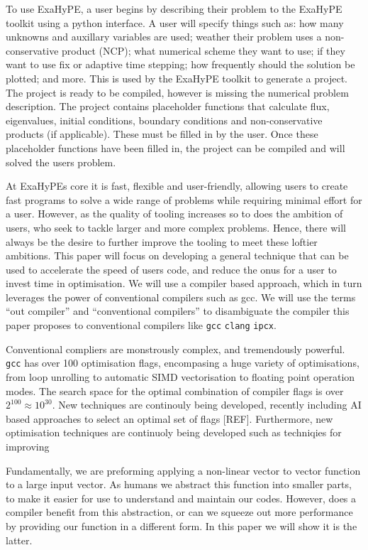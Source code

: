 To use ExaHyPE, a user begins by describing their problem to the ExaHyPE toolkit using a python interface.
A user will specify things such as: how many unknowns and auxillary variables are used; weather their problem uses a non-conservative product (NCP); what numerical scheme they want to use; if they want to use fix or adaptive time stepping; how frequently should the solution be plotted; and more.
This is used by the ExaHyPE toolkit to generate a project.
The project is ready to be compiled, however is missing the numerical problem description.
The project contains placeholder functions that calculate flux, eigenvalues, initial conditions, boundary conditions and non-conservative products (if applicable).   
These must be filled in by the user.
Once these placeholder functions have been filled in, the project can be compiled and will solved the users problem.


At ExaHyPEs core it is fast, flexible and user-friendly, allowing users to create fast programs to solve a wide range of problems while requiring minimal effort for a user.
However, as the quality of tooling increases so to does the ambition of users, who seek to tackle larger and more complex problems.
Hence, there will always be the desire to further improve the tooling to meet these loftier ambitions.
This paper will focus on developing a general technique that can be used to accelerate the speed of users code, and reduce the onus for a user to invest time in optimisation.
We will use a compiler based approach, which in turn leverages the power of conventional compilers such as gcc.
We will use the terms ``out compiler'' and ``conventional compilers'' to disambiguate the compiler this paper proposes to conventional compilers like \texttt{gcc} \texttt{clang} \texttt{ipcx}.  

Conventional compliers are monstrously complex, and tremendously powerful.
\texttt{gcc} has over 100 optimisation flags, encompasing a huge variety of optimisations, from loop unrolling to automatic SIMD vectorisation to floating point operation modes.
The search space for the optimal combination of compiler flags is over $2^{100}\approx 10^30$.
New techniques are continouly being developed, recently including AI based approaches to select an optimal set of flags [REF].
Furthermore, new optimisation techniques are continuoly being developed such as techniqies for improving 





Fundamentally, we are preforming applying a non-linear vector to vector function to a large input vector.
As humans we abstract this function into smaller parts, to make it easier for use to understand and maintain our codes.
However, does a compiler benefit from this abstraction, or can we squeeze out more performance by providing our function in a different form.
In this paper we will show it is the latter. 
